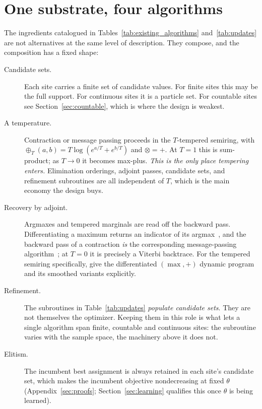 \section{One substrate, four algorithms}
\label{sec:algorithms}

The ingredients catalogued in Tables~\ref{tab:existing_algorithms} and~\ref{tab:updates} are not alternatives at the same level of description. They compose, and the composition has a fixed shape:
\begin{description}
    \item[Candidate sets.] Each site carries a finite set of candidate values. For finite sites this may be the full support. For continuous sites it is a particle set. For countable sites see Section~\ref{sec:countable}, which is where the design is weakest.
    \item[A temperature.] Contraction or message passing proceeds in the $T$-tempered semiring, with $\oplus_T(a,b) = T \log(e^{a/T} + e^{b/T})$ and $\otimes = +$. At $T = 1$ this is sum-product; as $T \rightarrow 0$ it becomes max-plus. \emph{This is the only place tempering enters.} Elimination orderings, adjoint passes, candidate sets, and refinement subroutines are all independent of $T$, which is the main economy the design buys.
    \item[Recovery by adjoint.] Argmaxes and tempered marginals are read off the backward pass. Differentiating a maximum returns an indicator of its argmax~\citep{Danskin1966}, and the backward pass of a contraction \emph{is} the corresponding message-passing algorithm~\citep{Darwiche2003, Eisner2016}; at $T = 0$ it is precisely a Viterbi backtrace. For the tempered semiring specifically, \citet{Mensch2018} give the differentiated $(\max,+)$ dynamic program and its smoothed variants explicitly.
    \item[Refinement.] The subroutines in Table~\ref{tab:updates} \emph{populate candidate sets}. They are not themselves the optimizer. Keeping them in this role is what lets a single algorithm span finite, countable and continuous sites: the subroutine varies with the sample space, the machinery above it does not.
    \item[Elitism.] The incumbent best assignment is always retained in each site's candidate set, which makes the incumbent objective nondecreasing at fixed $\theta$ (Appendix~\ref{sec:proofs}; Section~\ref{sec:learning} qualifies this once $\theta$ is being learned).
\end{description}

